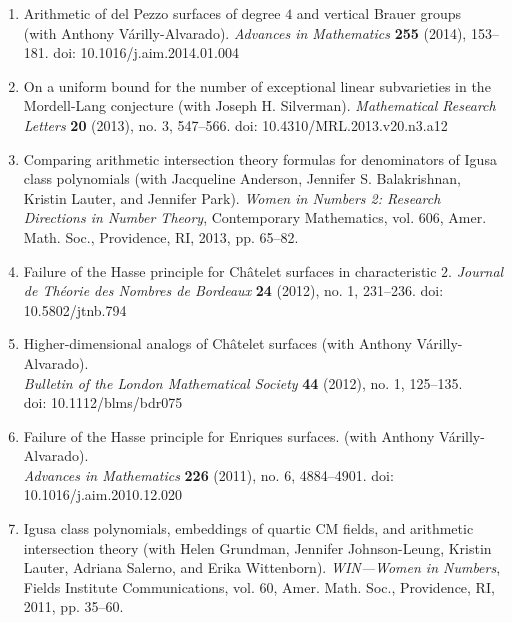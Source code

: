\documentclass[12pt]{article}
\begin{document}
\begin{enumerate}[itemsep=-1mm, leftmargin=24mm]
			\item 
			{Arithmetic of del Pezzo surfaces of degree $4$ and vertical Brauer 
			groups}\\ (with Anthony V\'arilly-Alvarado). 
			\textit{Advances in Mathematics} \textbf{255} (2014), 153--181. 
            doi: 10.1016/j.aim.2014.01.004

			\item
			{On a uniform bound for the number of exceptional linear 
			subvarieties in the Mordell-Lang conjecture}
			(with Joseph H. Silverman).
			\textit{Mathematical Research Letters}
			\textbf{20} (2013),  no. 3,  547--566. 
            doi: 10.4310/MRL.2013.v20.n3.a12

			\item
			{Comparing arithmetic intersection theory formulas for denominators 
			of Igusa class polynomials}
			(with Jacqueline Anderson, Jennifer S. Balakrishnan, Kristin 
			Lauter, and Jennifer Park).
			\textit{Women in Numbers 2: Research Directions in Number Theory}, 
			Contemporary Mathematics, vol. 606, Amer. Math. Soc., 
			Providence, RI, 2013, pp. 65--82.

			\item
			{Failure of the Hasse principle for Ch\^atelet surfaces in
			characteristic $2$}. 
			\textit{Journal de Th\'eorie des Nombres de Bordeaux}
			\textbf{24} (2012), no. 1, 231--236.
             doi: 10.5802/jtnb.794 
	
			\item
			{Higher-dimensional analogs of Ch\^atelet surfaces}
			(with Anthony V\'arilly-Alvarado). \\
			\textit{Bulletin of the London Mathematical Society} 
			\textbf{44} (2012), no. 1, 125--135.\\
            doi: 10.1112/blms/bdr075
	
			\item
			{Failure of the Hasse principle for Enriques surfaces}.
			(with Anthony V\'arilly-Alvarado).  \\
			\textit{Advances in Mathematics} 
			\textbf{226} (2011), no. 6, 4884--4901.
            doi: 10.1016/j.aim.2010.12.020
	
			\item
			{Igusa class polynomials, embeddings of quartic CM fields, 
			and arithmetic intersection theory} 
			(with Helen Grundman, Jennifer Johnson-Leung, Kristin Lauter, 
			Adriana Salerno, and Erika Wittenborn). 
			\textit{WIN---Women in Numbers}, Fields Institute 
			Communications, vol. 60, Amer. Math. Soc., Providence, RI, 
			2011, pp. 35--60.
	

\end{enumerate}
\end{document}
